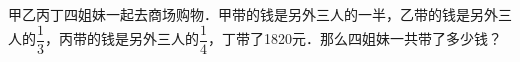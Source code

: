甲乙丙丁四姐妹一起去商场购物．甲带的钱是另外三人的一半，乙带的钱是另外三人的$\dfrac{1}{3}$，丙带的钱是另外三人的$\dfrac{1}{4}$，丁带了1820元．那么四姐妹一共带了多少钱？